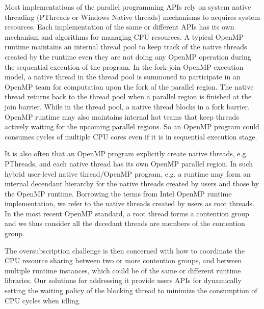 
Most implementations of the parallel programming APIs rely on system 
native threading (PThreads or Windows Native threads) mechanisms to acquires system resources. 
Each implementation of the same or different APIs has its own mechanism and algorithms for managing
CPU resources. 
A typical OpenMP runtime maintains 
an internal thread pool to keep track of the native threads created by the runtime even they are not  
doing any OpenMP operation during the sequential execution of the program. 
In the fork-join OpenMP execution model, a native thread in the thread pool 
is summoned to participate in an OpenMP team for computation upon the fork of the {\sf parallel} region. 
The native thread returns back to the thread pool when a parallel 
region is finished at the join barrier. While in the 
thread pool, a native thread blocks in a fork barrier. 
OpenMP runtime may also
maintains internal hot teams that keep threads actively waiting for the upcoming parallel regions. 
So an OpenMP program could consumes cycles of multiple CPU cores even if it is in sequential execution stage.

It is also often that an OpenMP program explicitly create native threads, e.g. PThreads, and each native thread has
its own OpenMP {\sf parallel} region. 
In such hybrid user-level native thread/OpenMP program, e.g. 
a runtime may form an internal decendant hierarchy for the native threads created by users and
those by the OpenMP runtime. Borrowing the terms from Intel OpenMP runtime implementation, we refer to 
the native threads created by users as root threads. 
In the most recent OpenMP standard, a root thread forms a contention group and we thus 
consider all the decedant threads are members of the contention group. 


The oversubscription challenge is then concerned with how 
to coordinate the CPU resource sharing between two or more contention groups, and between multiple 
runtime instances, which could be of the same or different runtime libraries. 
Our solutions for addressing it provide users APIs for 
dynamically setting the waiting policy of the blocking thread to minimize 
the consumption of CPU cycles when idling. 


